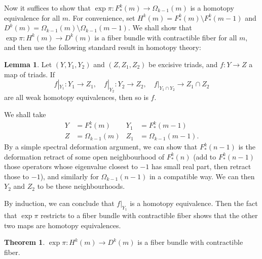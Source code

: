 \documentclass{shortart}
\theoremstyle{definition}
\newtheorem*{thm}{Theorem}
\newtheorem*{lemma}{Lemma}
\begin{document}
Now it suffices to show that $\exp \pi: F^k_*(m) \to \Omega_{k - 1}(m)$ is a homotopy equivalence for all $m$. For convenience, set $H^k(m) = F^k_*(m) \setminus F^k_*(m - 1)$ and $D^k(m) = \Omega_{k - 1}(m) \setminus \Omega_{k - 1}(m - 1)$. We shall show that $\exp \pi: H^k(m) \to D^k(m)$ is a fiber bundle with contractible fiber for all $m$, and then use the following standard result in homotopy theory:
\begin{lemma}
  Let $(Y, Y_1, Y_2)$ and $(Z, Z_1, Z_2)$ be excisive triads, and $f: Y \to Z$ a map of triads. If
  \[
    f|_{Y_1}: Y_1 \to Z_1,\quad f|_{Y_2}: Y_2 \to Z_2,\quad f|_{Y_1 \cap Y_2} \to Z_1 \cap Z_2
  \]
  are all weak homotopy equivalences, then so is $f$.
\end{lemma}

We shall take
\begin{align*}
  Y &= F^k_*(m) & Y_1 &= F^k_*(m - 1)\\
  Z &= \Omega_{k - 1}(m) & Z_1 &= \Omega_{k - 1}(m - 1).
\end{align*}
By a simple spectral deformation argument, we can show that $F^k_*(n - 1)$ is the deformation retract of some open neighbourhood of $F_*^k(n)$ (add to $F_*^k(n - 1)$ those operators whose eigenvalue closest to $-1$ has small real part, then retract those to $-1$), and similarly for $\Omega_{k - 1}(n - 1)$ in a compatible way. We can then $Y_2$ and $Z_2$ to be these neighbourhoods.

By induction, we can conclude that $f|_{Y_1}$ is a homotopy equivalence. Then the fact that $\exp \pi$ restricts to a fiber bundle with contractible fiber shows that the other two maps are homotopy equivalences. 

\begin{thm}
  $\exp \pi: H^k(m) \to D^k(m)$ is a fiber bundle with contractible fiber.
\end{thm}
\end{document}
